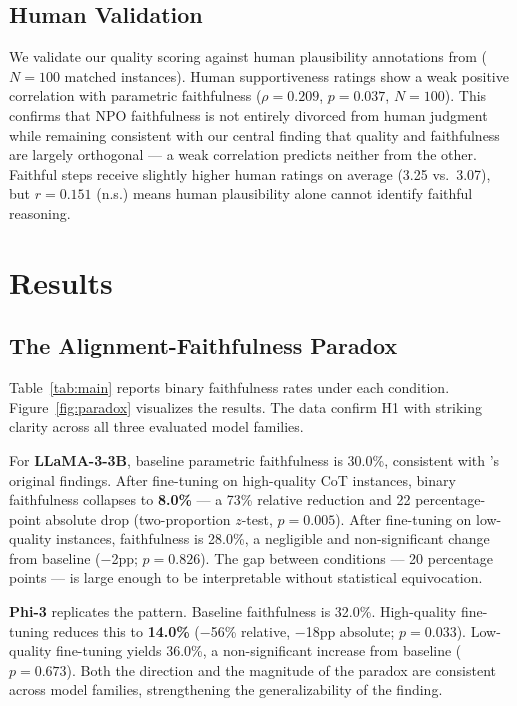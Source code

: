 \documentclass[11pt]{article}
\begin{document}
\subsection{Human Validation}

We validate our quality scoring against human plausibility
annotations from \citet{tutek2025faithfulness} ($N{=}100$ matched instances).
Human supportiveness ratings show a weak positive correlation with
parametric faithfulness ($\rho{=}0.209$, $p{=}0.037$, $N{=}100$).
This confirms that NPO faithfulness is not entirely divorced from
human judgment while remaining consistent with our central finding
that quality and faithfulness are largely orthogonal --- a weak
correlation predicts neither from the other. Faithful steps receive
slightly higher human ratings on average (3.25 vs.\ 3.07), but
$r{=}0.151$ (n.s.) means human plausibility alone cannot identify
faithful reasoning.

\section{Results}
\label{sec:results}

\subsection{The Alignment-Faithfulness Paradox}
\label{sec:paradox}

Table~\ref{tab:main} reports binary faithfulness rates under each condition.
Figure~\ref{fig:paradox} visualizes the results. The data confirm H1 with
striking clarity across all three evaluated model families.

For \textbf{LLaMA-3-3B}, baseline parametric faithfulness is 30.0\%,
consistent with \citet{tutek2025faithfulness}'s original findings. After
fine-tuning on high-quality CoT instances, binary faithfulness collapses to
\textbf{8.0\%} --- a 73\% relative reduction and 22 percentage-point absolute
drop (two-proportion $z$-test, $p = 0.005$). After fine-tuning on low-quality
instances, faithfulness is 28.0\%, a negligible and non-significant change from
baseline ($-$2pp; $p = 0.826$). The gap between conditions --- 20 percentage
points --- is large enough to be interpretable without statistical equivocation.

\textbf{Phi-3} replicates the pattern. Baseline faithfulness is 32.0\%.
High-quality fine-tuning reduces this to \textbf{14.0\%} ($-$56\% relative,
$-$18pp absolute; $p = 0.033$). Low-quality fine-tuning yields 36.0\%, a
non-significant increase from baseline ($p = 0.673$). Both the direction and
the magnitude of the paradox are consistent across model families, strengthening
the generalizability of the finding.
\end{document}
